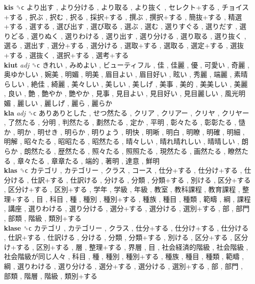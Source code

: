 \textbf{kis} ␝ϲ   より出す ,  より分ける ,  より取る ,  より抜く ,  セレクト+する ,  チョイス+する ,  択ぶ ,  択む ,  択る ,  採択+する ,  撰ぶ ,  撰択+する ,  簡抜+する ,  精選+する ,  選する ,  選び出す ,  選び取る ,  選ぶ ,  選む ,  選りすぐる ,  選りだす ,  選りどる ,  選りぬく ,  選りわける ,  選り出す ,  選り分ける ,  選り取る ,  選り抜く ,  選る ,  選出す ,  選分+する ,  選分ける ,  選取+する ,  選取る ,  選定+する ,  選抜+する ,  選抜く ,  選択+する ,  選考+する   \\
\textbf{kiut} \emph{adj}  ␝ϲ   きれい ,  みめよい ,  ビューティフル ,  佳 ,  佳麗 ,  優 ,  可愛い ,  奇麗 ,  奥ゆかしい ,  婉美 ,  明媚 ,  明美 ,  眉目よい ,  眉目好い ,  眩い ,  秀麗 ,  端麗 ,  素晴らしい ,  絶佳 ,  綺麗 ,  美々しい ,  美しい ,  美しげ ,  美事 ,  美的 ,  美美しい ,  美麗 ,  良い ,  艶 ,  艶やか ,  艷やか ,  見事 ,  見目よい ,  見目好い ,  見目麗しい ,  風光明媚 ,  麗しい ,  麗しげ ,  麗ら ,  麗らか   \\
\textbf{kla} \emph{adj}  ␝ϲ   ありありとした ,  せつ然たる ,  クリア ,  クリアー ,  クリヤ ,  クリヤー ,  了然たる ,  分明 ,  判然たる ,  劃然たる ,  定か ,  平明 ,  彰々たる ,  彰彰たる ,  慥か ,  明か ,  明せき ,  明らか ,  明りょう ,  明快 ,  明晰 ,  明白 ,  明瞭 ,  明確 ,  明細 ,  明解 ,  昭々たる ,  昭昭たる ,  昭然たる ,  晴々しい ,  晴れ晴れしい ,  晴晴しい ,  朗らか ,  朗然たる ,  歴然たる ,  照々たる ,  照照たる ,  現然たる ,  画然たる ,  瞭然たる ,  章々たる ,  章章たる ,  端的 ,  著明 ,  達意 ,  鮮明   \\
\textbf{klas} ␝ϲ   カテゴリ ,  カテゴリー ,  クラス ,  コース ,  仕分+する ,  仕分け+する ,  仕分ける ,  仕訳+する ,  仕訳ける ,  分ける ,  分類 ,  分類+する ,  別ける ,  区分+する ,  区分け+する ,  区別+する ,  学年 ,  学級 ,  年級 ,  教室 ,  教科課程 ,  教育課程 ,  整理+する ,  目 ,  科目 ,  種 ,  種別 ,  種別+する ,  種族 ,  種目 ,  種類 ,  範疇 ,  綱 ,  課程 ,  講座 ,  選りわける ,  選り分ける ,  選分+する ,  選分ける ,  選別+する ,  部 ,  部門 ,  部類 ,  階級 ,  類別+する   \\
\textbf{klase} ␝ϲ   カテゴリ ,  カテゴリー ,  クラス ,  仕分+する ,  仕分け+する ,  仕分ける ,  仕訳+する ,  仕訳ける ,  分ける ,  分類 ,  分類+する ,  別ける ,  区分+する ,  区分け+する ,  区別+する ,  層 ,  整理+する ,  界層 ,  目 ,  社会経済的階級 ,  社会階級 ,  社会階級が同じ人々 ,  科目 ,  種 ,  種別 ,  種別+する ,  種族 ,  種目 ,  種類 ,  範疇 ,  綱 ,  選りわける ,  選り分ける ,  選分+する ,  選分ける ,  選別+する ,  部 ,  部門 ,  部類 ,  階層 ,  階級 ,  類別+する   \\

